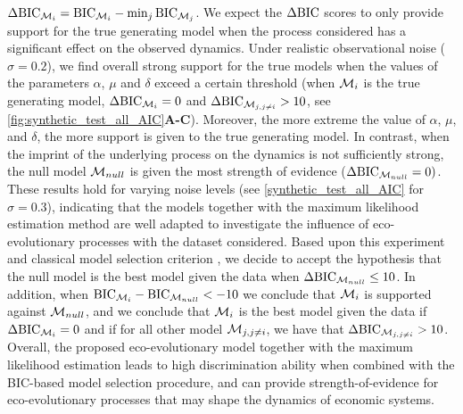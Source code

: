 %
$\Delta \text{BIC}_{\mathcal{M}_i} = \text{BIC}_{\mathcal{M}_i} - \min_{j} \text{BIC}_{\mathcal{M}_j}$. 
%
We expect the $\Delta \text{BIC}$ scores to only provide support for the true generating model when the process considered has a significant effect on the observed dynamics.
Under realistic observational noise ($\sigma = 0.2$), we find overall strong support for the true models when the values of the parameters $\alpha$, $\mu$ and $\delta$ exceed a certain threshold (when $\mathcal{M}_i$ is the true generating model, $\Delta\text{BIC}_{\mathcal{M}_{i}} = 0$ and $\Delta\text{BIC}_{\mathcal{M}_{j,j\neq i}} > 10$, see \cref{fig:synthetic_test_all_AIC}\textbf{A-C}). 
% 
% 
% 
Moreover, the more extreme the value of $\alpha$, $\mu$, and $\delta$, the more support is given to the true generating model.
% 
In contrast, when the imprint of the underlying process on the dynamics is not sufficiently strong, the null model $\mathcal{M}_{null}$ is given the most strength of evidence ($\Delta\text{BIC}_{\mathcal{M}_{null}} = 0)$.
% 
% 
These results hold for varying noise levels (see \cref{synthetic_test_all_AIC} for $\sigma = 0.3$), indicating that the models together with the maximum likelihood estimation method are well adapted to investigate the influence of eco-evolutionary processes with the dataset considered.
%
Based upon this experiment and classical model selection criterion \citep{Burnham2002}, we decide to accept the hypothesis that the null model is the best model given the data when $\Delta \text{BIC}_{\mathcal{M}_{null}} \leq 10$. In addition, when $\text{BIC}_{\mathcal{M}_i} - \text{BIC}_{\mathcal{M}_{null}} < -10$ we conclude that $\mathcal{M}_i$ is supported against $\mathcal{M}_{null}$, and we conclude that $\mathcal{M}_i$ is the best model given the data if $\Delta \text{BIC}_{\mathcal{M}_i} = 0 $ and if for all other model $\mathcal{M}_{j,j \neq i}$, we have that $\Delta \text{BIC}_{\mathcal{M}_{j,j \neq i}} > 10$.
Overall, the proposed eco-evolutionary model together with the maximum likelihood estimation leads to high discrimination ability when combined with the BIC-based model selection procedure, and can provide strength-of-evidence for eco-evolutionary processes that may shape the dynamics of economic systems.

